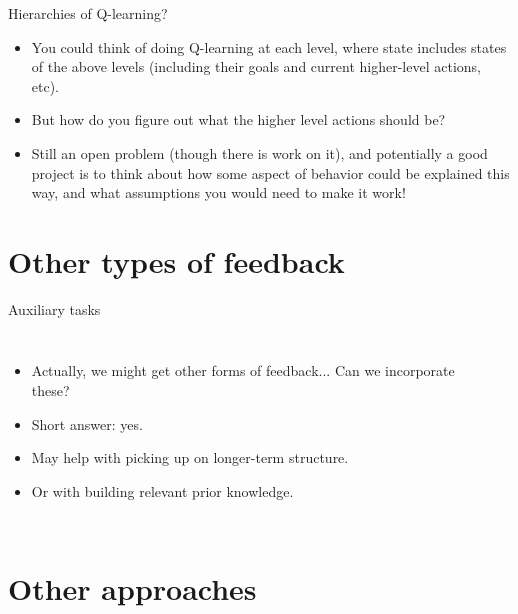 \documentclass{beamer} %
\begin{document}
\begin{frame}{Hierarchies of Q-learning?} 
\begin{itemize}
\item You could think of doing Q-learning at each level, where state includes states of the above levels (including their goals and current higher-level actions, etc).
\item<2-> But how do you figure out what the higher level actions should be?
\item<3-> Still an open problem (though there is work on it), and potentially a good project is to think about how some aspect of behavior could be explained this way, and what assumptions you would need to make it work!

\end{itemize}
\end{frame}

\section{Other types of feedback}

\begin{frame}{Auxiliary tasks} 
\begin{columns}
\begin{itemize}
    \item<1-> Actually, we might get other forms of feedback... Can we incorporate these?
    \item<2-> Short answer: yes.
    \item<3-> May help with picking up on longer-term structure.
    \item<4-> Or with building relevant prior knowledge.
\end{itemize}
    \begin{center}
    \end{center}
\end{columns}
\end{frame}

\section{Other approaches}
\end{document}
